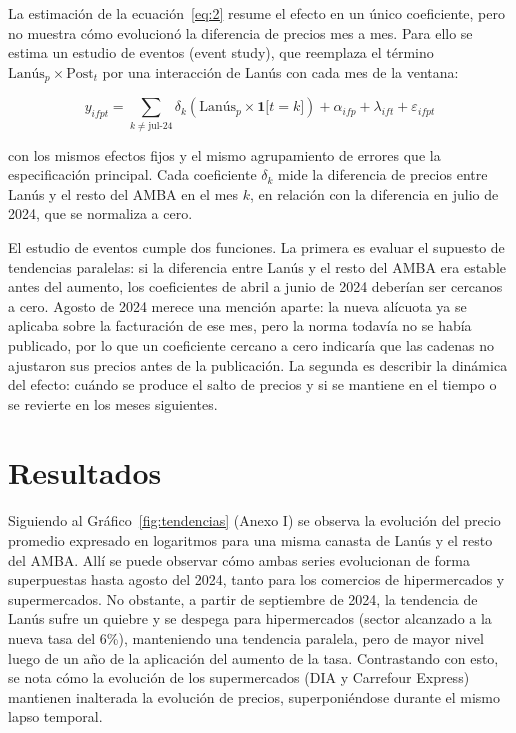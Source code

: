 La estimación de la ecuación~\eqref{eq:2} resume el efecto en un único coeficiente, pero no muestra cómo evolucionó la diferencia de precios mes a mes. Para ello se estima un estudio de eventos (event study), que reemplaza el término \(\text{Lanús}_{p} \times \text{Post}_{t}\) por una interacción de Lanús con cada mes de la ventana:

\begin{equation}\label{eq:6}
  y_{ifpt} = \sum_{k \neq \text{jul-24}}\delta_{k}\left( \text{Lanús}_{p} \times \mathbf{1}\lbrack t = k\rbrack \right) + \alpha_{ifp} + \lambda_{ift} + \varepsilon_{ifpt}
\end{equation}

con los mismos efectos fijos y el mismo agrupamiento de errores que la especificación principal. Cada coeficiente \(\delta_{k}\) mide la diferencia de precios entre Lanús y el resto del AMBA en el mes \(k\), en relación con la diferencia en julio de 2024, que se normaliza a cero.

El estudio de eventos cumple dos funciones. La primera es evaluar el supuesto de tendencias paralelas: si la diferencia entre Lanús y el resto del AMBA era estable antes del aumento, los coeficientes de abril a junio de 2024 deberían ser cercanos a cero. Agosto de 2024 merece una mención aparte: la nueva alícuota ya se aplicaba sobre la facturación de ese mes, pero la norma todavía no se había publicado, por lo que un coeficiente cercano a cero indicaría que las cadenas no ajustaron sus precios antes de la publicación. La segunda es describir la dinámica del efecto: cuándo se produce el salto de precios y si se mantiene en el tiempo o se revierte en los meses siguientes.

\section{Resultados}

Siguiendo al Gráfico~\ref{fig:tendencias} (Anexo I) se observa la evolución del precio promedio expresado en logaritmos para una misma canasta de Lanús y el resto del AMBA. Allí se puede observar cómo ambas series evolucionan de forma superpuestas hasta agosto del 2024, tanto para los comercios de hipermercados y supermercados. No obstante, a partir de septiembre de 2024, la tendencia de Lanús sufre un quiebre y se despega para hipermercados (sector alcanzado a la nueva tasa del 6\%), manteniendo una tendencia paralela, pero de mayor nivel luego de un año de la aplicación del aumento de la tasa. Contrastando con esto, se nota cómo la evolución de los supermercados (DIA y Carrefour Express) mantienen inalterada la evolución de precios, superponiéndose durante el mismo lapso temporal.


